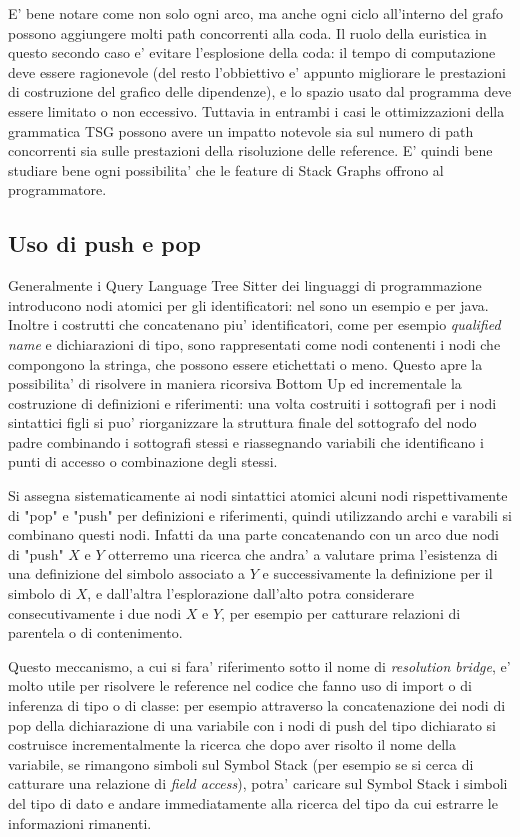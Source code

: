 \par
E' bene notare come non solo ogni arco, ma anche ogni ciclo all'interno del grafo possono aggiungere molti path concorrenti alla coda.
Il ruolo della euristica in questo secondo caso e' evitare l'esplosione della coda: il tempo di computazione deve essere ragionevole (del resto l'obbiettivo e' appunto migliorare le prestazioni di costruzione del grafico delle dipendenze), e lo spazio usato dal programma deve essere limitato o non eccessivo.
Tuttavia in entrambi i casi le ottimizzazioni della grammatica TSG possono avere un impatto notevole sia sul numero di path concorrenti sia sulle prestazioni della risoluzione delle reference. E' quindi bene studiare bene ogni possibilita' che le feature di Stack Graphs offrono al programmatore.

\subsection{Uso di push e pop}

Generalmente i Query Language Tree Sitter dei linguaggi di programmazione introducono nodi atomici per gli identificatori: nel sono un esempio \emph{} e \emph{} per java.
Inoltre i costrutti che concatenano piu' identificatori, come per esempio \emph{qualified name} e dichiarazioni di tipo, sono rappresentati come nodi contenenti i nodi che compongono la stringa, che possono essere etichettati o meno.
Questo apre la possibilita' di risolvere in maniera ricorsiva Bottom Up ed incrementale la costruzione di definizioni e riferimenti: una volta costruiti i sottografi per i nodi sintattici figli si puo' riorganizzare la struttura finale del sottografo del nodo padre combinando i sottografi stessi e riassegnando variabili che identificano i punti di accesso o combinazione degli stessi.

\par
Si assegna sistematicamente ai nodi sintattici atomici alcuni nodi rispettivamente di "pop" e "push" per definizioni e riferimenti, quindi utilizzando archi e varabili si combinano questi nodi.
Infatti da una parte concatenando con un arco due nodi di "push" $X$ e $Y$ otterremo una ricerca che andra' a valutare prima l'esistenza di una definizione del simbolo associato a $Y$ e successivamente la definizione per il simbolo di $X$, e dall'altra l'esplorazione dall'alto potra considerare consecutivamente i due nodi $X$ e $Y$, per esempio per catturare relazioni di parentela o di contenimento.

\par
Questo meccanismo, a cui si fara' riferimento sotto il nome di \emph{resolution bridge}, e' molto utile per risolvere le reference nel codice che fanno uso di import o di inferenza di tipo o di classe: per esempio attraverso la concatenazione dei nodi di pop della dichiarazione di una variabile con i nodi di push del tipo dichiarato si costruisce incrementalmente la ricerca che dopo aver risolto il nome della variabile, se rimangono simboli sul Symbol Stack (per esempio se si cerca di catturare una relazione di \emph{field access}), potra' caricare sul Symbol Stack i simboli del tipo di dato e andare immediatamente alla ricerca del tipo da cui estrarre le informazioni rimanenti.

